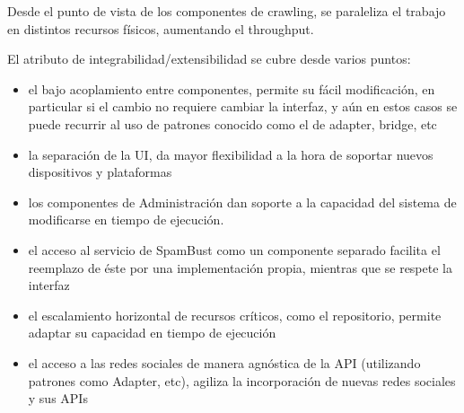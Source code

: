 Desde el punto de vista de los componentes de crawling, se paraleliza el trabajo en distintos recursos f\'isicos, aumentando el throughput.

El atributo de integrabilidad/extensibilidad se cubre desde varios puntos:

\begin{itemize}
\item el bajo acoplamiento entre componentes, permite su f\'acil modificaci\'on, en particular si el cambio no requiere cambiar la interfaz, y a\'un en estos casos se puede recurrir al uso de patrones conocido como el de adapter, bridge, etc
\item la separaci\'on de la UI, da mayor flexibilidad a la hora de soportar nuevos dispositivos y plataformas
\item los componentes de Administraci\'on dan soporte a la capacidad del sistema de modificarse en tiempo de ejecuci\'on.
\item el acceso al servicio de SpamBust como un componente separado facilita el reemplazo de \'este por una implementaci\'on propia, mientras que se respete la interfaz
\item el escalamiento horizontal de recursos cr\'iticos, como el repositorio, permite adaptar su capacidad en tiempo de ejecuci\'on
\item el acceso a las redes sociales de manera agn\'ostica de la API (utilizando patrones como Adapter, etc), agiliza la incorporaci\'on de nuevas redes sociales y sus APIs
\end{itemize}
  


 
